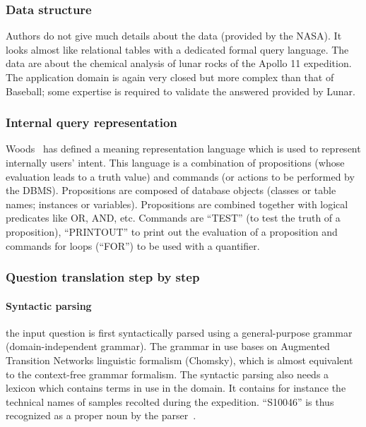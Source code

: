 \documentclass[10pt,journal,letterpaper,compsoc]{IEEEtran}
\begin{document}
\subsubsection{Data structure}
Authors do not give much details about the data (provided by the NASA). It looks
almost like relational tables with a dedicated formal query language.
The data are about the chemical analysis of lunar rocks of the Apollo 11
expedition. The application domain is again very closed but more complex than
that of {\sc Baseball}; some expertise is required to validate the answered
provided by {\sc Lunar}.

\subsubsection{Internal query representation}
\label{sec:lunar-query-representation}
Woods~\cite{Woods:1973:PNL:1499586.1499695} has defined a meaning representation
language which is used to represent internally users' intent. This language is a
combination of propositions (whose evaluation leads to a truth value) and
commands (or actions to be performed by the DBMS). Propositions are composed of
database objects (classes or table names; instances or variables). Propositions
are combined together with logical predicates like OR, AND, etc. Commands are
``TEST'' (to test the truth of a proposition), ``PRINTOUT'' to print out the
evaluation of a proposition and commands for loops (``FOR'') to be used with a
quantifier.

\subsubsection{Question translation step by step}
\paragraph{Syntactic parsing}the input question is first syntactically parsed
using a general-purpose grammar (domain-independent grammar). The grammar in use
bases on Augmented Transition Networks linguistic formalism (Chomsky), which is
almost equivalent to the context-free grammar formalism.
The syntactic parsing also needs a lexicon which contains terms in use in the
domain. It contains for instance the technical names of samples recolted during
the expedition. ``S10046'' is thus recognized as a proper noun by the
parser~\cite{Woods:1986:SQN:21922.24336}.
\end{document}
